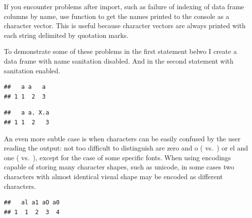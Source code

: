\documentclass[krantz2,ChapterTOCs]{krantz}\usepackage{knitr}
\begin{document}
\begin{warningbox}
If you encounter problems after import, such as failure of indexing of data frame columns by name, use function  to get the names printed to the console as a character vector. This is useful because character vectors are always printed with each string delimited by quotation marks.

To demonstrate some of these problems in the first statement belwo I create a data frame with name sanitation disabled. And in the second statement with sanitation enabled.
\begin{knitrout}\footnotesize
{}\color{fgcolor}\begin{kframe}
\begin{alltt}
\hlstd{(} \hlstd{=} \hlstd{,}  \hlstd{=} \hlstd{,}  \hlstd{=} \hlstd{,}  \hlstd{=} \hlstd{)}
\end{alltt}
\begin{verbatim}
##   a a   a
## 1 1  2  3
\end{verbatim}
\begin{alltt}
\hlstd{(} \hlstd{=} \hlstd{,}  \hlstd{=} \hlstd{,}  \hlstd{=} \hlstd{)}
\end{alltt}
\begin{verbatim}
##   a a. X.a
## 1 1  2   3
\end{verbatim}
\end{kframe}
\end{knitrout}

An even more subtle case is when characters can be easily confused by the user reading the output: not too difficult to distinguish are zero and o ( vs.\ ) or el and one ( vs.\ ), except for the case of some specific fonts. When using encodings capable of storing many character shapes, such as unicode, in some cases two characters with almost identical visual shape may be encoded as different characters.

\begin{knitrout}\footnotesize
{}\color{fgcolor}\begin{kframe}
\begin{alltt}
\hlstd{(} \hlstd{=} \hlstd{,}  \hlstd{=} \hlstd{,}  \hlstd{=} \hlstd{,}  \hlstd{=} \hlstd{)}
\end{alltt}
\begin{verbatim}
##   al a1 aO a0
## 1  1  2  3  4
\end{verbatim}
\end{kframe}
\end{knitrout}


\end{warningbox}
\end{document}
